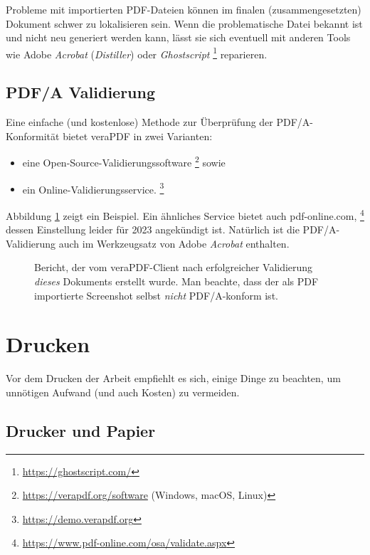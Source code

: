 Probleme mit importierten PDF-Dateien können im finalen (zusammengesetzten) Dokument
schwer zu lokalisieren sein. Wenn die problematische Datei bekannt ist und nicht 
neu generiert werden kann, lässt sie sich eventuell mit anderen Tools wie Adobe \emph{Acrobat} 
(\emph{Distiller}) oder \emph{Ghostscript}%
\footnote{\url{https://ghostscript.com/}}
reparieren.


\subsection{PDF/A Validierung}
\label{sec:PDFA-validation}

Eine einfache (und kostenlose) Methode zur Überprüfung der PDF/A-Konformität bietet
\textsf{veraPDF} in zwei Varianten:
%
\begin{itemize}
\item eine Open-Source-Validierungssoftware%
  \footnote{\url{https://verapdf.org/software} (Windows, macOS, Linux)} sowie
\item ein Online-Validierungsservice.%
  \footnote{\url{https://demo.verapdf.org}}
\end{itemize}
%
Abbildung \ref{fig:verapdf-report} zeigt ein Beispiel. Ein ähnliches Service bietet
auch \textsf{pdf-online.com},%
\footnote{\url{https://www.pdf-online.com/osa/validate.aspx}}
dessen Einstellung leider für 2023 angekündigt ist.
Natürlich ist die PDF/A-Validierung auch im Werkzeugsatz von Adobe \emph{Acrobat} enthalten.

\begin{figure}[htbp]
    \centering
    \caption{Bericht, der vom \textsf{veraPDF}-Client nach erfolgreicher Validierung 
    \emph{dieses} Dokuments erstellt wurde. Man beachte, dass der als PDF importierte Screenshot 
    selbst \emph{nicht} PDF/A-konform ist.}
    \label{fig:verapdf-report}
\end{figure}


\section{Drucken}

Vor dem Drucken der Arbeit empfiehlt es sich, einige Dinge zu beachten, um
unnötigen Aufwand (und auch Kosten) zu vermeiden.

\subsection{Drucker und Papier}

